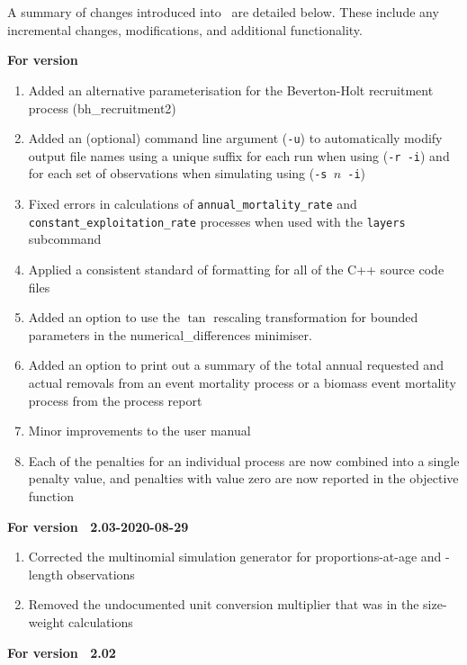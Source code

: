 \section{}

A summary of changes introduced into \SPM\ are detailed below. These include any incremental changes, modifications, and additional functionality.

\textbf{For version \SPM\ \VER}
\begin{enumerate}
  \item Added an alternative parameterisation for the Beverton-Holt recruitment process (bh\_recruitment2)
  \item Added an (optional) command line argument (\texttt{-u}) to automatically modify output file names using a unique suffix for each run when using (\texttt{-r -i}) and for each set of observations when simulating using (\texttt{-s \emph{$n$}\ -i})
	\item Fixed errors in calculations of \texttt{annual\_mortality\_rate} and \texttt{constant\_exploitation\_rate} processes when used with the \texttt{layers} subcommand
	\item Applied a consistent standard of formatting for all of the C++ source code files
	\item Added an option to use the $\tan$ rescaling transformation for bounded parameters in the numerical\_differences minimiser.
	\item Added an option to print out a summary of the total annual requested and actual removals from an event mortality process or a biomass event mortality process from the process report
	\item Minor improvements to the user manual
	\item Each of the penalties for an individual process are now combined into a single penalty value, and penalties with value zero are now reported in the objective function
\end{enumerate}

\textbf{For version \SPM\ 2.03-2020-08-29}
\begin{enumerate}
  \item Corrected the multinomial simulation generator for proportions-at-age and -length observations
	\item Removed the undocumented unit conversion multiplier that was in the size-weight calculations
\end{enumerate}

\textbf{For version \SPM\ 2.02}

